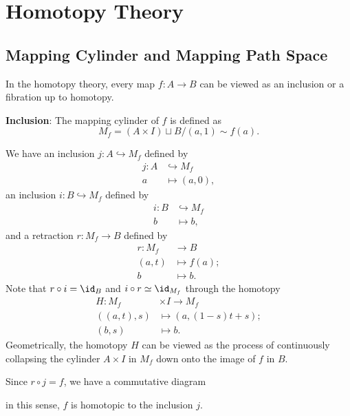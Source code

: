\newpage

\section{Homotopy Theory}
    \subsection{Mapping Cylinder and Mapping Path Space}
    In the homotopy theory, every map $f: A \to B$ 
    can be viewed as an inclusion or a fibration up to homotopy. 

    \textbf{Inclusion}:
    The mapping cylinder of $f$ is defined as
    \begin{equation*}
        M_f = (A\times I)\sqcup B\big/(a,1)\sim f(a).
    \end{equation*}
    
    We have an inclusion $j: A\hookrightarrow M_f$ defined by 
    \begin{align*}
        j:A&\hookrightarrow M_f \\
        a &\mapsto(a,0),
    \end{align*}
    an inclusion $i: B\hookrightarrow M_f$ defined by
    \begin{align*}
        i:B&\hookrightarrow M_f \\
        b &\mapsto b,
    \end{align*}
    and a retraction $r: M_f \to B$ defined by
    \begin{align*}
        r:M_f&\to B \\
        (a,t) &\mapsto f(a); \\
        b &\mapsto b.
    \end{align*}
    Note that $r\circ i = \id_B$ and $i\circ r \simeq \id_{M_f}$ 
    through the homotopy
    \begin{align*}
        H: M_f &\times I \to M_f \\
        ((a,t),s) &\mapsto (a,(1-s)t+s); \\
        (b,s) &\mapsto b. 
    \end{align*}
    Geometrically, the homotopy $H$ can be viewed as 
    the process of continuously collapsing 
    the cylinder $A\times I$ in $M_f$ down onto 
    the image of $f$ in $B$.

    Since $r\circ j = f$, we have a commutative diagram
    \begin{center}
    \end{center}
    in this sense, $f$ is homotopic to the inclusion $j$.

